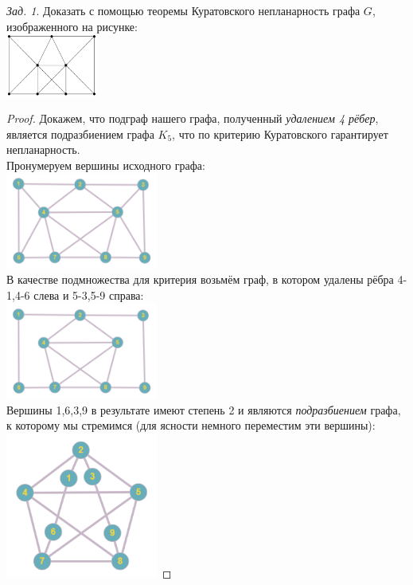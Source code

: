 \documentclass[a4paper,12pt]{article}
\numberwithin{figure}{section}
\theoremstyle{remark}
\newtheorem{problem}{Зад.}[section]
\begin{document}
\begin{problem}
	Доказать с помощью теоремы Куратовского непланарность графа $G$, изображенного на рисунке:
	\\ \includegraphics[width=3cm]{kuratovsky-task1-stage0.png}
\end{problem}
\begin{proof}
	Докажем, что подграф нашего графа, полученный \textit{удалением 4 рёбер}, является подразбиением графа $K_5$, что по критерию Куратовского гарантирует непланарность.
	\\ Пронумеруем вершины исходного графа:
	\\ \includegraphics[width=5cm]{kuratovsky-task1-stage1.png}
	\\ В качестве подмножества для критерия возьмём граф, в котором удалены рёбра 4-1,4-6 слева и 5-3,5-9 справа:
	\\ \includegraphics[width=5cm]{kuratovsky-task1-stage2.png}
	\\ Вершины 1,6,3,9 в результате имеют степень 2 и являются \textit{подразбиением} графа, к которому мы стремимся (для ясности немного переместим эти вершины):
	\\ \includegraphics[width=5cm]{kuratovsky-task1-stage3.png}

\end{proof}
\end{document}
